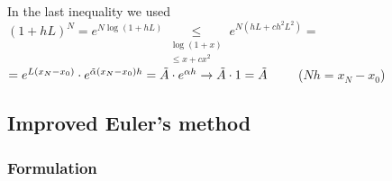 \begin{remark}
  In the last inequality we used $(1+hL)^N = e^{N\log(1+hL)} \underset{\substack{\log(1+x)\\\leq x + cx^2}}{\leq} e^{N(hL + ch^2L^2)} =$ $=e^{L(x_N-x_0)}\cdot e^{\Tilde{\alpha}(x_N-x_0)h} = \Tilde{A}\cdot e^{\alpha h} \to \Tilde{A}\cdot 1 = \Tilde{A}\qquad$ ($Nh = x_N-x_0$)
\end{remark}

\newpage

\subsection{Improved Euler's method} \label{imprEu}
\subsubsection{Formulation}
